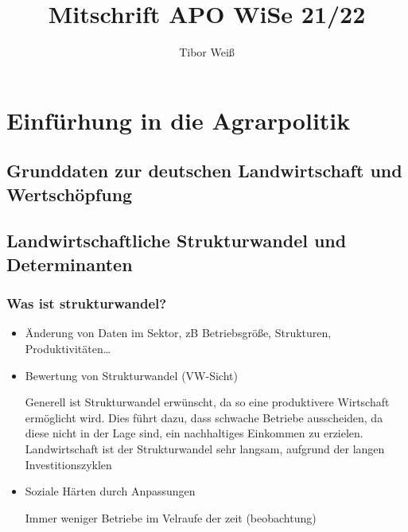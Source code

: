 \documentclass[11pt]{article}
\title{Mitschrift APO WiSe 21/22}
\author{Tibor Weiß}
\begin{document}
\maketitle
\section{Einfürhung in die Agrarpolitik}

\subsection{Grunddaten zur deutschen Land\-wirt\-schaft und Wert\-schöpf\-ung}


\subsection{Landwirtschaftliche Strukturwandel und Determinanten}

\subsubsection{Was ist strukturwandel?}
\begin{itemize}
	\item{Änderung von Daten im Sektor, zB Betriebsgröße, Strukturen, Produktivitäten\ldots}
	\item{Bewertung von Strukturwandel (VW-Sicht)}

		Generell ist Strukturwandel erwünscht, da so eine produktivere Wirtschaft ermöglicht wird. Dies führt dazu, dass \glqq schwache\grqq{}  Betriebe ausscheiden, da diese nicht in der Lage sind, ein nachhaltiges Einkommen zu erzielen.
Landwirtschaft ist der Strukturwandel sehr langsam, aufgrund der langen Investitionszyklen
	\item{Soziale Härten durch Anpassungen}

Immer weniger Betriebe im Velraufe der zeit (beobachtung)

\end{itemize}
\end{document}
